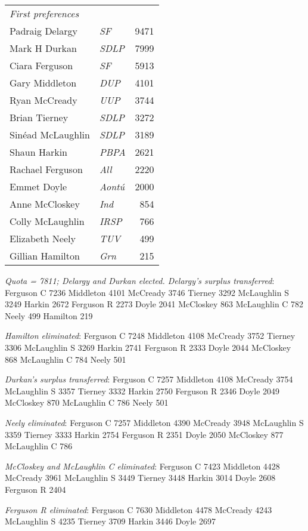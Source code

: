 \begin{resultsiii}
\noindent
\begin{tabular*}{\columnwidth}{@{\extracolsep{\fill}} p{} >{\itshape}l r @{\extracolsep{\fill}}}
	\emph{First preferences}\\
	Padraig Delargy & SF & 9471\\
	Mark H Durkan & SDLP & 7999\\
	Ciara Ferguson & SF & 5913\\
	Gary Middleton & DUP & 4101\\
	Ryan McCready & UUP & 3744\\
	Brian Tierney & SDLP & 3272\\
	Sinéad McLaughlin & SDLP & 3189\\
	Shaun Harkin & PBPA & 2621\\
	Rachael Ferguson & All & 2220\\
	Emmet Doyle & Aontú & 2000\\
	Anne McCloskey & Ind & 854\\
	Colly McLaughlin & IRSP & 766\\
	Elizabeth Neely & TUV & 499\\
	Gillian Hamilton & Grn & 215\\
\end{tabular*}

\emph{Quota = 7811; Delargy and Durkan elected.  Delargy's surplus transferred}: Ferguson C 7236 Middleton 4101 McCready 3746 Tierney 3292 McLaughlin S 3249 Harkin 2672 Ferguson R 2273 Doyle 2041 McCloskey 863 McLaughlin C 782 Neely 499 Hamilton 219

\emph{Hamilton eliminated}: Ferguson C 7248 Middleton 4108 McCready 3752 Tierney 3306 McLaughlin S 3269 Harkin 2741 Ferguson R 2333 Doyle 2044 McCloskey 868 McLaughlin C 784 Neely 501

\emph{Durkan's surplus transferred}: Ferguson C 7257 Middleton 4108 McCready 3754 McLaughlin S 3357 Tierney 3332 Harkin 2750 Ferguson R 2346 Doyle 2049 McCloskey 870 McLaughlin C 786 Neely 501

\emph{Neely eliminated}: Ferguson C 7257 Middleton 4390 McCready 3948 McLaughlin S 3359 Tierney 3333 Harkin 2754 Ferguson R 2351 Doyle 2050 McCloskey 877 McLaughlin C 786

\emph{McCloskey and McLaughlin C eliminated}: Ferguson C 7423 Middleton 4428 McCready 3961 McLaughlin S 3449 Tierney 3448 Harkin 3014 Doyle 2608 Ferguson R 2404

\emph{Ferguson R eliminated}: Ferguson C 7630 Middleton 4478 McCready 4243 McLaughlin S 4235 Tierney 3709 Harkin 3446 Doyle 2697


\end{resultsiii}
